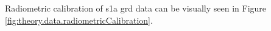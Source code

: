 Radiometric calibration of \acs{s1a} \acs{grd} data can be visually seen in Figure \ref{fig:theory.data.radiometricCalibration}.



